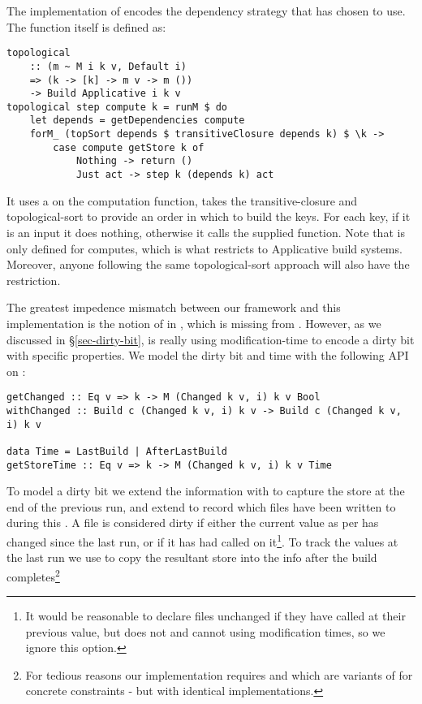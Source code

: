 The implementation of  encodes the dependency strategy that \Make has chosen to use. The function itself is defined as:

\begin{verbatim}
topological
    :: (m ~ M i k v, Default i)
    => (k -> [k] -> m v -> m ())
    -> Build Applicative i k v
topological step compute k = runM $ do
    let depends = getDependencies compute
    forM_ (topSort depends $ transitiveClosure depends k) $ \k ->
        case compute getStore k of
            Nothing -> return ()
            Just act -> step k (depends k) act
\end{verbatim}

It uses a  on the computation function, takes the transitive-closure and topological-sort to provide an order in which to build the keys. For each key, if it is an input it does nothing, otherwise it calls the supplied  function. Note that  is only defined for  computes, which is what restricts \Make to Applicative build systems. Moreover, anyone following the same topological-sort approach will also have the  restriction.

The greatest impedence mismatch between our framework and this implementation is the notion of  in , which is missing from . However, as we discussed in \S\ref{sec-dirty-bit}, \Make is really using modification-time to encode a dirty bit with specific properties. We model the dirty bit and time with the following API on :

\begin{verbatim}
getChanged :: Eq v => k -> M (Changed k v, i) k v Bool
withChanged :: Build c (Changed k v, i) k v -> Build c (Changed k v, i) k v

data Time = LastBuild | AfterLastBuild
getStoreTime :: Eq v => k -> M (Changed k v, i) k v Time
\end{verbatim}

To model a dirty bit we extend the  information with  to capture the  store at the end of the previous run, and extend  to record which files have been written to during this . A file is considered dirty if either the current value as per  has changed since the last run, or if it has had  called on it\footnote{It would be reasonable to declare files unchanged if they have  called at their previous value, but \Excel does not and \Make cannot using modification times, so we ignore this option.}. To track the values at the last run we use  to copy the resultant  store into the info after the build completes\footnote{For tedious reasons our implementation requires  and  which are variants of  for concrete constraints  - but with identical implementations.}

